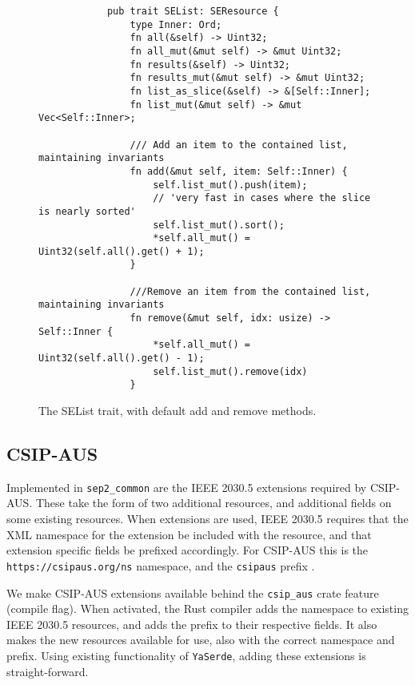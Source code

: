 \begin{figure}[H]
    \begin{center}
        \begin{lstlisting}
            pub trait SEList: SEResource {
                type Inner: Ord;
                fn all(&self) -> Uint32;
                fn all_mut(&mut self) -> &mut Uint32;
                fn results(&self) -> Uint32;
                fn results_mut(&mut self) -> &mut Uint32;
                fn list_as_slice(&self) -> &[Self::Inner];
                fn list_mut(&mut self) -> &mut Vec<Self::Inner>;
            
                /// Add an item to the contained list, maintaining invariants
                fn add(&mut self, item: Self::Inner) {
                    self.list_mut().push(item);
                    // 'very fast in cases where the slice is nearly sorted'
                    self.list_mut().sort();
                    *self.all_mut() = Uint32(self.all().get() + 1);
                }
                
                ///Remove an item from the contained list, maintaining invariants
                fn remove(&mut self, idx: usize) -> Self::Inner {
                    *self.all_mut() = Uint32(self.all().get() - 1);
                    self.list_mut().remove(idx)
                }
        \end{lstlisting}
        \label{fig:listtraitimpl}
        \caption{The SEList trait, with default add and remove methods.}
    \end{center}
\end{figure}

\subsection{CSIP-AUS}
Implemented in \texttt{sep2\_common} are the IEEE 2030.5 extensions required by CSIP-AUS. These take the form of two additional resources, and additional fields on some existing resources. When extensions are used, IEEE 2030.5 requires that the XML namespace for the extension be included with the resource, and that extension specific fields be prefixed accordingly. For CSIP-AUS this is the \texttt{https://csipaus.org/ns} namespace, and the \texttt{csipaus} prefix  \cite{CSIPAus}.

We make CSIP-AUS extensions available behind the \texttt{csip\_aus} crate feature (compile flag). When activated, the Rust compiler adds the namespace to existing IEEE 2030.5 resources, and adds the prefix to their respective fields. It also makes the new resources available for use, also with the correct namespace and prefix. Using existing functionality of \texttt{YaSerde}, adding these extensions is straight-forward.

